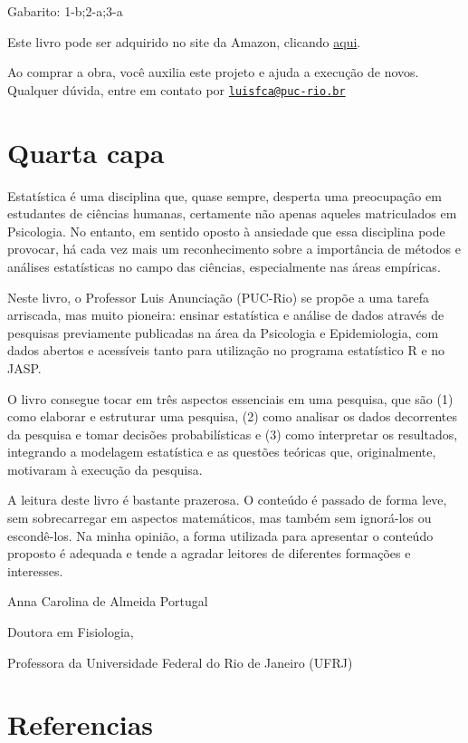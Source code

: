 \documentclass[
]{book}
\begin{document}
Gabarito: 1-b;2-a;3-a

Este livro pode ser adquirido no site da Amazon, clicando \href{https://www.amazon.com.br/gp/product/B097CP7T9M?pf_rd_r=RDZC8XYMBC1WY69T0J8K\&pf_rd_p=abb22e6b-8812-4b76-a424-5f0b098d2c90\&pd_rd_r=ceec1911-f409-4acd-ac8f-2d5bc68dac43\&pd_rd_w=wMUzJ\&pd_rd_wg=ZK85a\&ref_=pd_gw_unk}{aqui}.

Ao comprar a obra, você auxilia este projeto e ajuda a execução de novos. Qualquer dúvida, entre em contato por \href{mailto:luisfca@puc-rio.br}{\nolinkurl{luisfca@puc-rio.br}}

\hypertarget{quarta-capa}{%
\chapter{Quarta capa}\label{quarta-capa}}

Estatística é uma disciplina que, quase sempre, desperta uma preocupação em estudantes de ciências humanas, certamente não apenas aqueles matriculados em Psicologia. No entanto, em sentido oposto à ansiedade que essa disciplina pode provocar, há cada vez mais um reconhecimento sobre a importância de métodos e análises estatísticas no campo das ciências, especialmente nas áreas empíricas.

Neste livro, o Professor Luis Anunciação (PUC-Rio) se propõe a uma tarefa arriscada, mas muito pioneira: ensinar estatística e análise de dados através de pesquisas previamente publicadas na área da Psicologia e Epidemiologia, com dados abertos e acessíveis tanto para utilização no programa estatístico R e no JASP.

O livro consegue tocar em três aspectos essenciais em uma pesquisa, que são (1) como elaborar e estruturar uma pesquisa, (2) como analisar os dados decorrentes da pesquisa e tomar decisões probabilísticas e (3) como interpretar os resultados, integrando a modelagem estatística e as questões teóricas que, originalmente, motivaram à execução da pesquisa.

A leitura deste livro é bastante prazerosa. O conteúdo é passado de forma leve, sem sobrecarregar em aspectos matemáticos, mas também sem ignorá-los ou escondê-los. Na minha opinião, a forma utilizada para apresentar o conteúdo proposto é adequada e tende a agradar leitores de diferentes formações e interesses.

Anna Carolina de Almeida Portugal

Doutora em Fisiologia,

Professora da Universidade Federal do Rio de Janeiro (UFRJ)

\hypertarget{referencias}{%
\chapter{Referencias}\label{referencias}}

  
\end{document}
